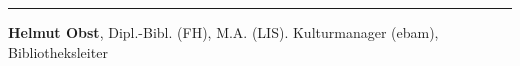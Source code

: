 \begin{center}\rule{0.5\linewidth}{\linethickness}\end{center}

\textbf{Helmut Obst}, Dipl.-Bibl. (FH), M.A. (LIS). Kulturmanager
(ebam), Bibliotheksleiter
